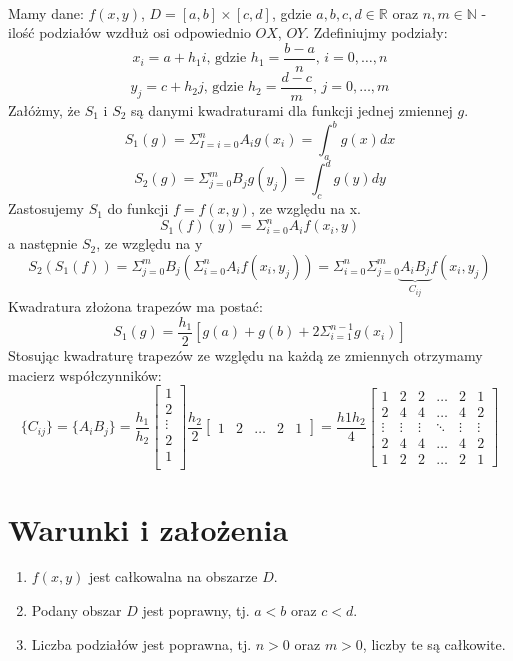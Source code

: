 \documentclass{article}
\begin{document}
\paragraph{}
Mamy dane: $f(x,y)$, $D = [a,b]\times[c,d]$, gdzie $a,b,c,d\in\mathbb{R}$ oraz $n,m\in\mathbb{N}$ - ilość podziałów wzdłuż osi odpowiednio $OX$, $OY$. Zdefiniujmy podziały:
$$x_i=a+h_1i\text{, gdzie }h_1=\dfrac{b-a}{n}\text{, }i=0,\dots,n$$
$$y_j=c+h_2j\text{, gdzie }h_2=\dfrac{d-c}{m}\text{, }j=0,\dots,m$$
Załóżmy, że $S_1$ i $S_2$ są danymi kwadraturami dla funkcji jednej zmiennej $g$.\\
$$S_1(g) = \Sigma_{I=i=0}^{n}A_ig(x_i)=\int_a^bg(x)dx$$
$$S_2(g) = \Sigma_{j=0}^{m}B_jg(y_j)=\int_c^dg(y)dy$$
Zastosujemy $S_1$ do funkcji $f=f(x,y)$, ze względu na x.
$$S_1(f)(y)=\Sigma_{i=0}^nA_if(x_i,y)$$
a następnie $S_2$, ze względu na y
$$S_2(S_1(f))=\Sigma_{j=0}^mB_j(\Sigma_{i=0}^nA_if(x_i,y_j))=\Sigma_{i=0}^n\Sigma_{j=0}^m\underbrace{A_iB_j}_{C_{ij}}f(x_i,y_j)$$
Kwadratura złożona trapezów ma postać:
$$S_1(g)=\frac{h_1}{2}[g(a)+g(b)+2\Sigma_{i=1}^{n-1}g(x_i)]$$
Stosując kwadraturę trapezów ze względu na każdą ze zmiennych otrzymamy macierz współczynników:
$$\{C_{ij}\}=\{A_iB_j\}=\frac{h_1}{h_2}
\begin{bmatrix}
1\\
2\\
\vdots\\
2\\
1\\
\end{bmatrix}
\frac{h_2}{2}
\begin{bmatrix}
1 & 2 & \dots & 2 & 1
\end{bmatrix}=\frac{h1h_2}{4}
\begin{bmatrix}
1 & 2 & 2 & \dots & 2 & 1\\
2 & 4 & 4 & \dots & 4 & 2\\
\vdots & \vdots & \vdots & \ddots & \vdots & \vdots\\
2 & 4 & 4 & \dots & 4 & 2\\
1 & 2 & 2 & \dots & 2 & 1
\end{bmatrix}$$
\section{Warunki i założenia}
\begin{enumerate}
\item $f(x,y)$ jest całkowalna na obszarze $D$.
\item Podany obszar $D$ jest poprawny, tj. $a<b$ oraz $c<d$.
\item Liczba podziałów jest poprawna, tj. $n >0$ oraz $m > 0$, liczby te są całkowite.
\end{enumerate}
\end{document}
